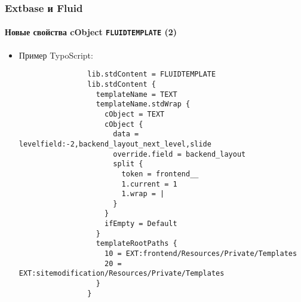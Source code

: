 \begin{frame}[fragile]
	\frametitle{Extbase и Fluid}
	\framesubtitle{Новые свойства cObject \texttt{FLUIDTEMPLATE} (2)}

	\lstset{basicstyle=\tiny\ttfamily}

	\begin{itemize}

		\item Пример TypoScript:

			\begin{lstlisting}
				lib.stdContent = FLUIDTEMPLATE
				lib.stdContent {
				  templateName = TEXT
				  templateName.stdWrap {
				    cObject = TEXT
				    cObject {
				      data = levelfield:-2,backend_layout_next_level,slide
				      override.field = backend_layout
				      split {
				        token = frontend__
				        1.current = 1
				        1.wrap = |
				      }
				    }
				    ifEmpty = Default
				  }
				  templateRootPaths {
				    10 = EXT:frontend/Resources/Private/Templates
				    20 = EXT:sitemodification/Resources/Private/Templates
				  }
				}
			\end{lstlisting}

	\end{itemize}

\end{frame}


